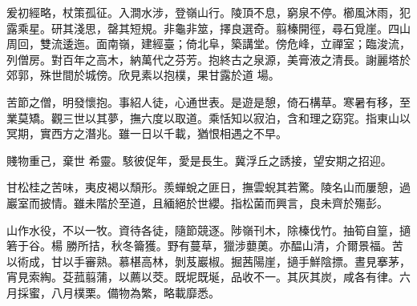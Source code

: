 \begin{pinyinscope}
爰初經略，杖策孤征。入澗水涉，登嶺山行。陵頂不息，窮泉不停。櫛風沐雨，犯露乘星。研其淺思，罄其短規。非龜非筮，擇良選奇。翦榛開徑，尋石覓崖。四山周回，雙流逶迤。面南嶺，建經臺；倚北阜，築講堂。傍危峰，立禪室；臨浚流，列僧房。對百年之高木，納萬代之芬芳。抱終古之泉源，美膏液之清長。謝麗塔於郊郭，殊世間於城傍。欣見素以抱樸，果甘露於道
 場。


苦節之僧，明發懷抱。事紹人徒，心通世表。是遊是憩，倚石構草。寒暑有移，至業莫矯。觀三世以其夢，撫六度以取道。乘恬知以寂泊，含和理之窈窕。指東山以冥期，實西方之潛兆。雖一日以千載，猶恨相遇之不早。



 賤物重己，棄世
 希靈。駭彼促年，愛是長生。冀浮丘之誘接，望安期之招迎。


甘松桂之苦味，夷皮褐以頹形。羨蟬蛻之匪日，撫雲蜺其若驚。陵名山而屢憩，過巖室而披情。雖未階於至道，且緬絕於世纓。指松菌而興言，良未齊於殤彭。


山作水役，不以一牧。資待各徒，隨節競逐。陟嶺刊木，除榛伐竹。抽筍自篁，擿箬于谷。楊
 勝所拮，秋冬籥獲。野有蔓草，獵涉蘡薁。亦醖山清，介爾景福。苦以術成，甘以手審熟。慕椹高林，剝芨巖椒。掘茜陽崖，擿手鮮陰摽。晝見搴茅，宵見索綯。芟菰翦蒲，以薦以茭。既坭既埏，品收不一。其灰其炭，咸各有律。六月採蜜，八月樸栗。備物為繁，略載靡悉。



\end{pinyinscope}
